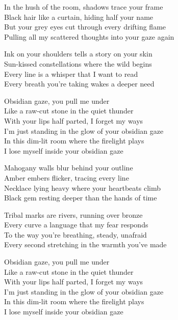 \begin{lyrics}
In the hush of the room, shadows trace your frame\\
Black hair like a curtain, hiding half your name\\
But your grey eyes cut through every drifting flame\\
Pulling all my scattered thoughts into your gaze again

Ink on your shoulders tells a story on your skin\\
Sun-kissed constellations where the wild begins\\
Every line is a whisper that I want to read\\
Every breath you’re taking wakes a deeper need

Obsidian gaze, you pull me under\\
Like a raw-cut stone in the quiet thunder\\
With your lips half parted, I forget my ways\\
I’m just standing in the glow of your obsidian gaze\\
In this dim-lit room where the firelight plays\\
I lose myself inside your obsidian gaze

Mahogany walls blur behind your outline\\
Amber embers flicker, tracing every line\\
Necklace lying heavy where your heartbeats climb\\
Black gem resting deeper than the hands of time

Tribal marks are rivers, running over bronze\\
Every curve a language that my fear responds\\
To the way you’re breathing, steady, unafraid\\
Every second stretching in the warmth you’ve made

Obsidian gaze, you pull me under\\
Like a raw-cut stone in the quiet thunder\\
With your lips half parted, I forget my ways\\
I’m just standing in the glow of your obsidian gaze\\
In this dim-lit room where the firelight plays\\
I lose myself inside your obsidian gaze


\end{lyrics}
